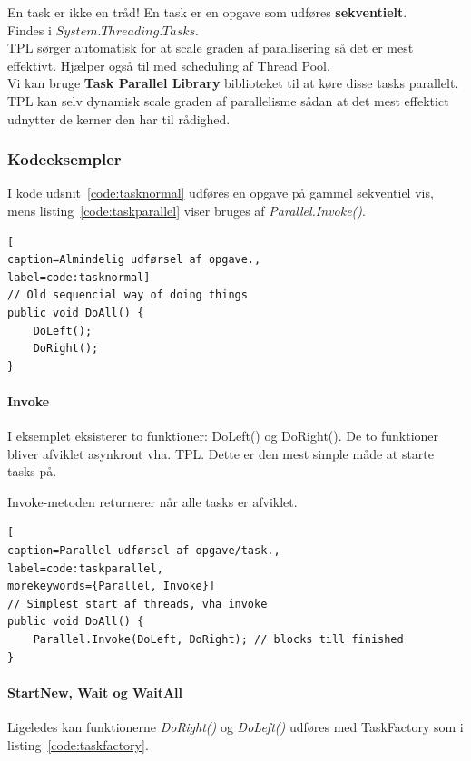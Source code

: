 En task er ikke en tråd! En task er en opgave som udføres \textbf{sekventielt}.\\

Findes i $System.Threading.Tasks$.\\

TPL sørger automatisk for at scale graden af parallisering så det er mest effektivt. Hjælper også til med scheduling af Thread Pool.\\

Vi kan bruge \textbf{Task Parallel Library} biblioteket til at køre disse tasks parallelt. TPL kan selv dynamisk scale graden af parallelisme sådan at det mest effektict udnytter de kerner den har til rådighed.

\subsubsection{Kodeeksempler}

I kode udsnit~\ref{code:tasknormal} udføres en opgave på gammel sekventiel vis, mens listing~\ref{code:taskparallel} viser bruges af \textit{Parallel.Invoke()}.

\begin{lstlisting}[
caption=Almindelig udførsel af opgave.,
label=code:tasknormal]
// Old sequencial way of doing things
public void DoAll() {
	DoLeft();
	DoRight();
}
\end{lstlisting}

\paragraph{Invoke}
I eksemplet eksisterer to funktioner: DoLeft() og DoRight(). De to funktioner bliver afviklet asynkront vha. TPL. Dette er den mest simple måde at starte tasks på.

Invoke-metoden returnerer når alle tasks er afviklet.
\begin{lstlisting}[
caption=Parallel udførsel af opgave/task.,
label=code:taskparallel,
morekeywords={Parallel, Invoke}]
// Simplest start af threads, vha invoke
public void DoAll() {
	Parallel.Invoke(DoLeft, DoRight); // blocks till finished
}
\end{lstlisting}

\paragraph{StartNew, Wait og WaitAll}
Ligeledes kan funktionerne \textit{DoRight()} og \textit{DoLeft()} udføres med TaskFactory som i listing~\ref{code:taskfactory}.

